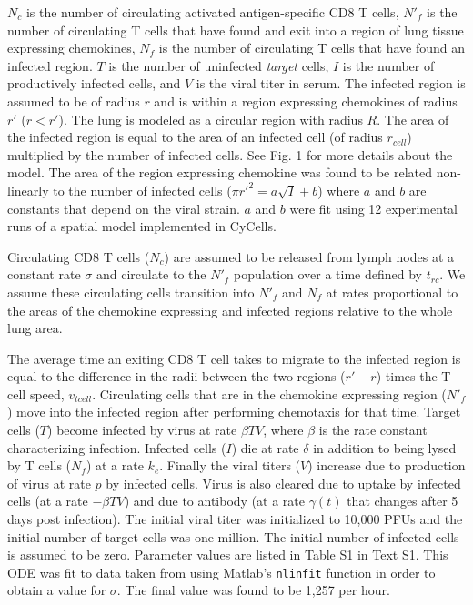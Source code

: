 \documentclass[10pt]{article}
\begin{document}
$N_{c}$ is the number of circulating activated antigen-specific CD8 T cells, $N'_{f}$ is the number of circulating T cells that have found and exit into a region of lung tissue expressing chemokines, $N_{f}$ is the number of circulating T cells that have found an infected region. $T$ is the number of uninfected \textit{target} cells, $I$ is the number of productively infected cells, and $V$ is the viral titer in serum. The infected region is assumed to be of radius $r$ and is within a region expressing chemokines of radius $r'$ ($r  < r'$). The lung is modeled as a circular region with radius $R$. The area of the infected region is equal to the area of an infected cell (of radius $r_{cell}$) multiplied by the number of infected cells. See Fig. 1 for more details about the model.  The area of the region expressing chemokine was found to be related non-linearly to the number of infected cells ($\pi r'^{2} = a \sqrt{I} + b$) where $a$ and $b$ are constants that depend on the viral strain.  $a$ and $b$ were fit using 12 experimental runs of a spatial model implemented in CyCells.

Circulating CD8 T cells ($N_{c}$) are assumed to be released from lymph nodes at a constant rate $\sigma$ and circulate to the $N'_{f}$ population over a time defined by $t_{rc}$. We assume these circulating cells transition into $N'_{f}$ and $N_{f}$ at rates proportional to the areas of the chemokine expressing and infected regions relative to the whole lung area. 

The average time an exiting CD8 T cell takes to migrate to the infected region is equal to the difference in the radii between the two regions ($r' - r$) times the T cell speed, $v_{tcell}$.  Circulating cells that are in the chemokine expressing region ($N'_{f}$) move into the infected region after performing chemotaxis for that time. Target cells ($T$) become infected by virus at rate $\beta TV$, where $\beta$ is the rate constant characterizing infection. Infected cells ($I$) die at rate $\delta$ in addition to being lysed by T cells ($N_{f}$) at a rate $k_{e}$. Finally the viral titers ($V$) increase due to production of virus at rate $p$ by infected cells. Virus is also cleared due to uptake by infected cells (at a rate $- \beta TV$) and due to antibody (at a rate $\gamma (t)$ that changes after 5 days post infection). The initial viral titer was initialized to 10,000 PFUs and the initial number of target cells was one million. The initial number of infected cells is assumed to be zero. Parameter values are listed in Table S1 in Text S1.  This ODE was fit to data taken from \cite{Miao2010} using Matlab's \texttt{nlinfit} function in order to obtain a value for $\sigma$.  The final value was found to be 1,257 per hour.
\end{document}
